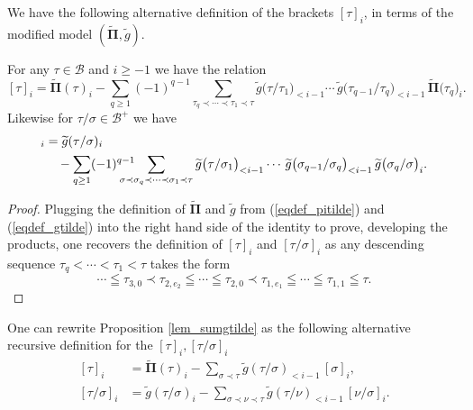 \documentclass[11pt]{preprint}
\newcommand{\mcB}{\mathcal{B}}
\def\PPi{\boldsymbol{\Pi}}
\def\eqref#1{(\ref{#1})}
\begin{document}
	We have the following alternative definition of the brackets $[\tau]_i$, in terms of the modified model $({\widetilde{\PPi}}, \widetilde{g})$.
	\begin{proposition}\label{lem_sumgtilde}
		For any $\tau\in\mcB$ and $i\geq -1$ we have the relation
		\[
		[\tau]_i =  \widetilde{ \PPi}(\tau)_i - \sum_{q\geq 1} (-1)^{q-1} \sum_{\tau_q\prec\cdots\prec\tau_1\prec\tau} \widetilde{ g}\big(\tau/\tau_1\big)_{<i-1} \cdots \,  \widetilde{ g}\big(\tau_{q-1}/\tau_{q}\big)_{<i-1} \,  \widetilde{ \PPi} \big(\tau_q\big)_i.
		\]
		Likewise for $\tau/\sigma\in \mcB^+$ we have
		\begin{align*}
			[\tau/\sigma]_i &=  \widetilde{ g}(\tau/\sigma)_i 
			\\
			&\quad - \sum_{q\geq 1} (-1)^{q-1}  \hspace{-0.5cm}\sum_{\sigma\prec\sigma_q\prec\cdots\prec\sigma_1\prec\tau} \widetilde{ g}\big(\tau/\sigma_1\big)_{<i-1}\cdots \, \widetilde{ g}\big(\sigma_{q-1}/\sigma_{q}\big)_{<i-1} \,  \widetilde{ g}\big(\sigma_q/\sigma\big)_i.
		\end{align*}
	\end{proposition}
	
	\begin{proof} 
		Plugging the definition of $\widetilde{ \PPi}$ and $\widetilde{ g}$ from \eqref{eqdef_pitilde} and \eqref{eqdef_gtilde} into the right hand side of the identity to prove, developing the products, one recovers the definition of $[\tau]_i$ and $[\tau/\sigma]_i$ as any descending sequence $\tau_q<\cdots<\tau_1<\tau$ takes the form
		$$
		\cdots\leqq\tau_{3,0}\prec \tau_{2,e_2} \leqq \cdots  \leqq  \tau_{2,0} \prec \tau_{1,e_1} \leqq \cdots \leqq \tau_{1,1} \leqq \tau.
		$$
	\end{proof}
	One can rewrite Proposition \ref{lem_sumgtilde} as the following alternative recursive definition for the $[\tau]_i,[\tau/\sigma]_i$
	\begin{equation}\label{eq_defreccrochettilde}
		\begin{aligned}
		[\tau]_i & = \widetilde{\PPi}(\tau)_i - \sum_{\sigma\prec\tau} \widetilde{ g}(\tau/\sigma)_{<i-1} \, [\sigma]_i, \\
		[\tau/\sigma]_i & = \widetilde{ g}(\tau/\sigma)_i - \sum_{\sigma\prec\nu\prec\tau}  \widetilde{ g}(\tau/\nu)_{<i-1} \, [\nu/\sigma]_i.
		\end{aligned}
	\end{equation}
	
	
	
	
\end{document}
